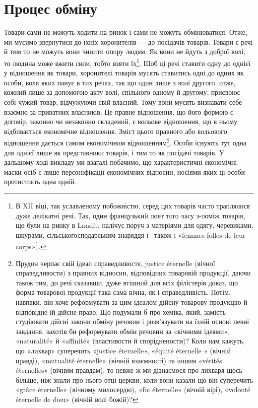 \section{Процес обміну}

Товари сами не можуть ходити на ринок і сами не можуть
обмінюватися. Отже, ми мусимо звернутися до їхніх хоронителів —
до посідачів товарів. Товари є речі й тим то не можуть вони чинити
опору людям. Як вони не йдуть з доброї волі, то людина може
вжити сили, тобто взяти їх\footnote{
В XII віці, так уславленому побожністю, серед цих товарів часто
траплялися дуже делікатні речі. Так, один французький поет того часу
з-поміж товарів, що були на ринку в Landit, налічує поруч з матеріями
для одягу, черевиками, шкурами, сільськогосподарським знаряддя і~
також і «femmes folles de leur corps»\footnote*{
— повій. Peд.
}.}. Щоб ці речі ставити одну до однієї
у відношення як товари, хоронителі товарів мусять ставитись
одні до одних як особи, воля яких панує в тих речах, так що один
лише з волі другого, отже, кожний лише за допомогою акту волі,
спільного одному й другому, присвоює собі чужий товар, відчужуючи
свій власний. Тому вони мусять визнавати себе взаємно
за приватних власників. Це правне відношення, що його формою
є договір, законно чи незаконно складений, є вольове відношення,
що в ньому відбивається економічне відношення. Зміст цього
правного або вольового відношення дається самим економічним
відношенням\footnote{
Прудон черпає свій ідеал справедливосте, justice éternelle (вічної
справедливости) з правних відносин, відповідних товаровій продукції,
даючи також тим, до речі сказавши, дуже втішний для всіх філістерів
доказ, що форма товарової продукції така сама вічна, як і справедливість.
Потім, навпаки, він хоче реформувати за цим ідеалом дійсну товарову
продукцію й відповідне їй дійсне право. Що подумали б про хеміка, який,
замість студіювати дійсні закони обміну речовин і розв’язувати на їхній
основі певні завдання, захотів би реформувати обмін речовин за «вічними
ідеями», «naturalité» й «affinité» (властивости й споріднености)? Коли
нам кажуть, що «лихвар» суперечить «justice éternelle», «équité éternelle
» (вічній правді), «mutualité éternelle» (вічній взаємності) та іншим
«vérités éternelles» (вічним правдам), то невже ж ми дізнаємося про лихваря
щось більше, ніж знали про нього отці церкви, коли вони казали
що він суперечить «grâce éternelle» (вічному милосердю), «foi éternelle»
(вічній вірі), «volonté éternelle de dieu» (вічній волі божій)?
}. Особи існують тут одна для однієї лише як представники
товарів, і тим то як посідачі товарів. У дальшому ході
викладу ми взагалі побачимо, що характеристичні економічні
маски осіб є лише персоніфікації економічних відносин, носіями
яких ці особи протистоять одна одній.

